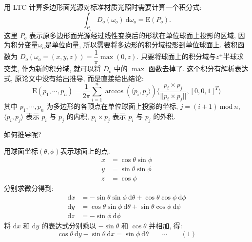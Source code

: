用 LTC 计算多边形面光源对标准材质光照时需要计算一个积分式:
\[
\int_{P_o}{D_o(\omega_o)}\ \mathrm{d}\omega_o = \mathrm{E}(P_o) .
\]
这里 $P_o$ 表示原多边形面光源经过线性变换后的形状在单位球面上投影的区域, 因为积分变量$\omega_o$是单位向量, 所以需要将多边形的积分域投影到单位球面上. 被积函数为 $D_o(\omega_o = (x, y, z)) = \dfrac{1}{\pi}\max(0, z)$. 只要将球面上的积分域与$z^+$半球求交集, 作为新的积分域, 就可以将 $D_o$ 中的 $\max$ 函数去掉了. 这个积分有解析表达式, 原论文中没有给出推导, 而是直接给出结论:
\[
\mathrm{E}(p_1,\cdots,p_n) = \frac{1}{2\pi}\sum_{i=1}^{n}{\arccos( \langle p_i,p_j \rangle) \langle  \frac{p_i\times p_j}{||p_i\times p_j||}, [0,0,1]^T\rangle}
\]
其中 $p_1, \cdots, p_n$ 为多边形的各顶点在单位球面上投影的坐标, $j=(i+1)\ \mathrm{mod}\ n$, $\langle p_i, p_j \rangle$ 表示 $p_i$ 与 $p_j$ 的内积,  $p_i \times p_j$ 表示 $p_i$ 与 $p_j$ 的外积.

如何推导呢?

用球面坐标$(\theta,\phi)$表示球面上的点. 
\begin{align*}
x &= \cos\theta\sin\phi \\
y &= \sin\theta\sin\phi \\
z &= \cos\phi
\end{align*}
分别求微分得到:
\begin{align*}
\mathrm{d}x &= -\sin\theta\sin\phi\ \mathrm{d}\theta + \cos\theta\cos\phi\ \mathrm{d}\phi \\
\mathrm{d}y &= \cos\theta\sin\phi\ \mathrm{d}\theta + \sin\theta\cos\phi\ \mathrm{d}\phi\\
\mathrm{d}z &= -\sin\phi\ \mathrm{d}\phi
\end{align*}
将 $\mathrm{d}x$ 和 $\mathrm{d}y$ 的表达式分别乘以 $-\sin\theta$ 和 $\cos\theta$ 并相加, 得:
\[
\cos\theta\ \mathrm{d}y - \sin\theta\ \mathrm{d}x = \sin\phi\ \mathrm{d}\theta \qquad\cdots\qquad (1)
\]

